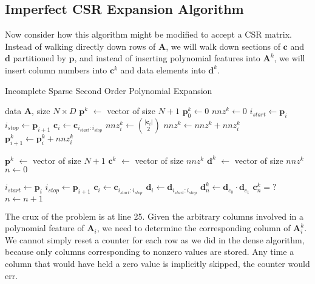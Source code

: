 \documentclass{article}
\begin{document}
\subsection{Imperfect CSR Expansion Algorithm}
\label{sec:final-algo}
Now consider how this algorithm might be modified to accept a CSR matrix.
Instead of walking directly down rows of $\bm{A}$, we will walk down sections of $\bm{c}$ and $\bm{d}$ partitioned by $\bm{p}$, and instead of inserting polynomial features into $\bm{A}^k$, we will insert column numbers into $\bm{c}^k$ and data elements into $\bm{d}^k$.

\begin{algorithm}[H]
   \caption{Incomplete Sparse Second Order Polynomial Expansion}
   \label{alg:Incomplete-Sparse-Second-Order-Polynomial-Expansion}
\begin{algorithmic}[1]
    data $\bm{A}$, size $N \times D$
   \STATE $\bm{p}^k$ $\gets$ vector of size $N+1$
   \STATE $\bm{p}^k_0 \gets 0$
   \STATE $nnz^k \gets 0$
      \STATE $i_{start} \gets \bm{p}_i$
      \STATE $i_{stop} \gets \bm{p}_{i+1}$
      \STATE $\bm{c}_i \gets \bm{c}_{i_{start}:i_{stop}}$
      \STATE $nnz^k_i \gets \binom{|\bm{c}_i|}{2}$ \label{li:row_nnz_count}
      \STATE $nnz^k \gets nnz^k + nnz^k_i$
      \STATE $\bm{p}^k_{i+1} \gets \bm{p}^k_i + nnz^k_i$
  \ENDFOR
  
  \STATE $\bm{p}^k$ $\gets$ vector of size $N+1$
  \STATE $\bm{c}^k$ $\gets$ vector of size $nnz^k$
  \STATE $\bm{d}^k$ $\gets$ vector of size $nnz^k$
  \STATE $n \gets 0$
  
      \STATE $i_{start} \gets \bm{p}_i$
      \STATE $i_{stop} \gets \bm{p}_{i+1}$
      \STATE $\bm{c}_i \gets \bm{c}_{i_{start}:i_{stop}}$
      \STATE $\bm{d}_i \gets \bm{d}_{i_{start}:i_{stop}}$
              \STATE $\bm{d}^k_{n} \gets \bm{d}_{c_0} \cdot \bm{d}_{c_1}$
              \STATE $\bm{c}^k_{n} = ?$ \label{li:set_ck}
              \STATE $n \gets n + 1$
          \ENDFOR
      \ENDFOR
  \ENDFOR
\end{algorithmic}
\end{algorithm}

The crux of the problem is at line 25. %
Given the arbitrary columns involved in a polynomial feature of $\bm{A}_i$, we need to determine the corresponding column of $\bm{A}^k_i$.
We cannot simply reset a counter for each row as we did in the dense algorithm,  because only columns corresponding to nonzero values are stored.
Any time a column that would have held a zero value is implicitly skipped, the counter would err.
\end{document}
